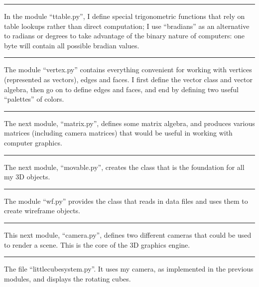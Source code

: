 \documentclass{article}
\newcommand{\sectionline}{
\begin{center}
   \rule{1in}{.01in}
\end{center}
}
\begin{document}



\sectionline

In the module ``ttable.py'', I define special trigonometric functions that rely on table lookups rather than direct computation; I use ``bradians'' as an alternative to radians or degrees to take advantage of the binary nature of computers:  one byte will contain all possible bradian values.




\sectionline

The module ``vertex.py'' contains everything convenient for working with vertices (represented as vectors), edges and faces.  I first define the vector class and vector algebra, then go on to define edges and faces, and end by defining two useful ``palettes'' of colors.




\sectionline

The next module, ``matrix.py'', defines some matrix algebra, and produces various matrices (including camera matrices) that would be useful in working with computer graphics.




\sectionline

The next module, ``movable.py'', creates the class that is the foundation for all my 3D objects.




\sectionline

The module ``wf.py'' provides the class that reads in data files and uses them to create wireframe objects.




\sectionline

This next module, ``camera.py'', defines two different cameras that could be used to render a scene.  This is the core of the 3D graphics engine.




\sectionline

The file ``littlecubesystem.py''.  It uses my camera, as implemented in the previous modules, and displays the rotating cubes.
\end{document}
